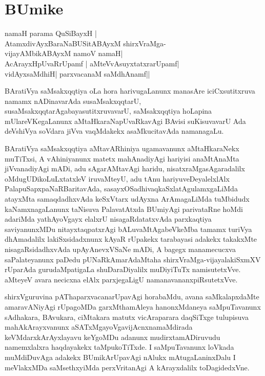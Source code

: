 \makeatletter
\def\@makeschapterhead#1{%
  \vspace*{10\p@}%
  {\parindent \z@ \centering \normalfont
    \interlinepenalty\@M
    \huge \bfseries  #1\par\nobreak
    \chaptermark{#1}
    \vskip 12\p@
  }}
\makeatother

\chapter*{BUmike}

\begin{center}
namaH parama QuSiBayxH |\\
AtamxdivAyxBaraNaBUSitABAyxM shirxVraMga-\\
vijayAMbikABAyxM namoV namaH|\\
AcArayxHpUvaRrUpamf | aMteVvAsuyxtatxrarUpamf|\\
vidAyxsaMdhiH| parxvacanaM saMdhAnamf||
\end{center}

BAratiVya saMsakxqqtiya oLa hora harivugaLanunx manasAre iciCxsutitxruva \hbox{namamx} nADinavarAda susaMsakxqqtarU, susaMsakxqqtarAgabayasutitxruvavarU, saMsakxqqtiya hoLapina mUlareVKegaLanunx aMtaHkaraNapUvaRkavAgi BAvisi suKisuvavarU Ada deVshiVya soVdara jiVva vaqMdakekx asaMkucitavAda namanagaLu.

BAratiVya saMsakxqqtiya aMtavARhiniya ugamavanunx aMtaHkaraNekx muTiTxsi, A vAhiniyanunx matetx mahAnadiyAgi hariyisi anaMtAnaMta jiVvanadiyAgi mADi, adu sAgarAMtavAgi haridu, nisatxraMgasAgaradalilx oMdugUDikoLuLxtatxleV iruvaMteyU, adu tAnu hariyuveDeyalelxlAlx PalapuSapxpaNaRBaritavAda, 
sasayxOSadhivaqkaSxlatAgulamxgaLiMda atayxMta samaqdadhxvAda keSxVtarx udAyxna ArAmagaLiMda tuMbidudx kaNamxnagaLanunx taNisuva PalavatAtxda BUmiyAgi parivataRne hoMdi adariMda yathAyoVgayx elalxrU nisagaRdatatxvAda parxkaqtiya saviyanunxMDu nitayxtaqpatxrAgi bALuvaMtAgabeVkeMba tamamx turiVya dhAmadalilx lakiSxsidadxnunx kAyaR rUpakekx tarabayasi adakekx takakxMte nisagaRsidadhxvAda upAyAnevxVSaNe mADi, A bagegx manamecucxva saPalateyanunx paDedu pUNaRkAmarAdaMtaha shirxVraMga-vijayalakiSxmXV rUparAda gurudaMpatigaLa shuDaraDiyalilx muDiyiTuTx namisutetxVve. aMteyeV avara necicxna elAlx parxjegaLigU namanavananxpiRsutetxVve.

shirxVguruvina pAThaparxvacanarUpavAgi horabaMdu, avana saMkalapxdaMte amaravANiyAgi rUpagoMDa garxMthamAleya hanonxMdaneya saMpuTavanunx sAdhakara, BAvukara, ciMtakara matutx vicAraparara daqSiTxge tulupisuva mahAkArayxvanunx aSATxMgayoVgavijAcnxnamaMdirada keVMdarxkArAyxlayavu keYgoMDu adanunx mudirxtamADiruvudu namemxlalxra haqdayakekx taMpukoTiTxde. I saMpuTavanunx loVkada muMdiDuvAga adakekx BUmikArUpavAgi nAlukx mAtugaLaninxDalu I meVlakxMDa saMsethxyiMda perxVritanAgi A kArayxdalilx toDagidedxVne.

